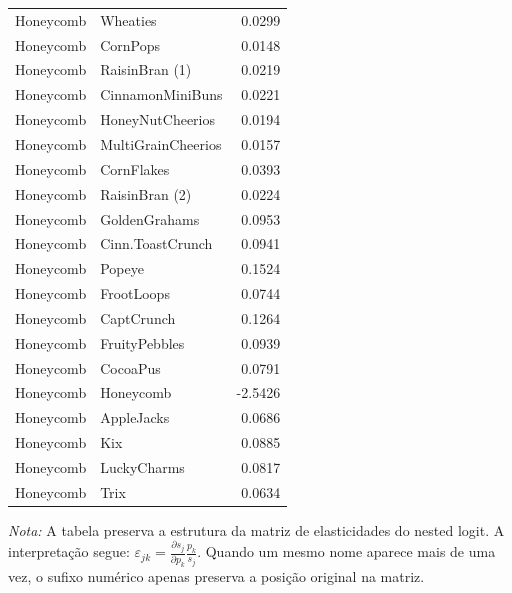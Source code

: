 \begin{table}[H]
\begin{tabular}{llr}
Honeycomb & Wheaties & 0.0299 \\
Honeycomb & CornPops & 0.0148 \\
Honeycomb & RaisinBran (1) & 0.0219 \\
Honeycomb & CinnamonMiniBuns & 0.0221 \\
Honeycomb & HoneyNutCheerios & 0.0194 \\
Honeycomb & MultiGrainCheerios & 0.0157 \\
Honeycomb & CornFlakes & 0.0393 \\
Honeycomb & RaisinBran (2) & 0.0224 \\
Honeycomb & GoldenGrahams & 0.0953 \\
Honeycomb & Cinn.ToastCrunch & 0.0941 \\
Honeycomb & Popeye & 0.1524 \\
Honeycomb & FrootLoops & 0.0744 \\
Honeycomb & CaptCrunch & 0.1264 \\
Honeycomb & FruityPebbles & 0.0939 \\
Honeycomb & CocoaPus & 0.0791 \\
Honeycomb & Honeycomb & -2.5426 \\
Honeycomb & AppleJacks & 0.0686 \\
Honeycomb & Kix & 0.0885 \\
Honeycomb & LuckyCharms & 0.0817 \\
Honeycomb & Trix & 0.0634 \\
\bottomrule
\end{tabular}

\vspace{0.3em}
\footnotesize
\textit{Nota:} A tabela preserva a estrutura da matriz de elasticidades do nested logit. A interpretação segue: $\varepsilon_{jk}=\frac{\partial s_j}{\partial p_k}\frac{p_k}{s_j}$. Quando um mesmo nome aparece mais de uma vez, o sufixo numérico apenas preserva a posição original na matriz.
\end{table}
\endgroup


